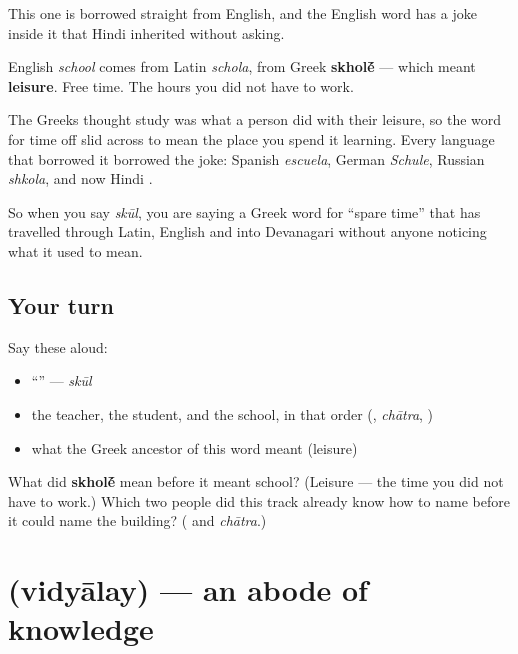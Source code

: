 \begin{cousinweb}
This one is borrowed straight from English, and the English word has a joke inside it that Hindi inherited without asking.

English \emph{school} comes from Latin \emph{schola}, from Greek \textbf{skhol\'{\={e}}} — which meant \textbf{leisure}. Free time. The hours you did not have to work.

The Greeks thought study was what a person did with their leisure, so the word for time off slid across to mean the place you spend it learning. Every language that borrowed it borrowed the joke: Spanish \emph{escuela}, German \emph{Schule}, Russian \emph{shkola}, and now Hindi \textbf{}.

So when you say \emph{skūl}, you are saying a Greek word for \textquotedblleft{}spare time\textquotedblright{} that has travelled through Latin, English and into Devanagari without anyone noticing what it used to mean.
\end{cousinweb}

\subsection*{Your turn}
Say these aloud:

\begin{itemize}
\raggedright
  \item \textquotedblleft{}\textquotedblright{} — \emph{skūl}
  \item the teacher, the student, and the school, in that order (, \emph{chātra}, )
  \item what the Greek ancestor of this word meant (leisure)
\end{itemize}

\begin{tcolorbox}[breakable,colback=teal!4,colframe=teal!35!black,title={Before you move on}]
What did \textbf{skhol\'{\={e}}} mean before it meant school? (Leisure — the time you did not have to work.) Which two people did this track already know how to name before it could name the building? ( and \emph{chātra}.)
\end{tcolorbox}
\section[\texorpdfstring{\hi{विद्यालय} (vidyālay)}{विद्यालय (vidyālay)}]{ (vidyālay) — an abode of knowledge}


